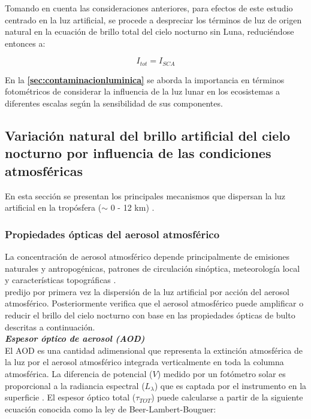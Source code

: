 Tomando en cuenta las consideraciones anteriores, para efectos de este estudio centrado en la luz artificial, se procede a despreciar los términos de luz de origen natural en la ecuación de brillo total del cielo nocturno sin Luna, reduciéndose entonces a:

\begin{equation}
I_{tot} = I_{SCA}
\end{equation}

En la \textbf{\autoref{sec:contaminacionluminica}} se aborda la importancia en términos fotométricos de considerar la influencia de la luz lunar en los ecosistemas a diferentes escalas según la sensibilidad de sus componentes.\\

\subsection{Variación natural del brillo artificial del cielo nocturno por influencia de las condiciones atmosféricas}

En esta sección se presentan los principales mecanismos que dispersan la luz artificial en la tropósfera ($\sim$ 0 - 12 km) \citep{Lohmann2016}.

\subsubsection{Propiedades ópticas del aerosol atmosférico}

La concentración de aerosol atmosférico depende principalmente de emisiones naturales y antropogénicas, patrones de circulación sinóptica, meteorología local y características topográficas \citep{Carabali2017}.\\

\cite{Garstang1991} predijo por primera vez la dispersión de la luz artificial por acción del aerosol atmosférico. Posteriormente \cite{Kocifaj2007} verifica que el aerosol atmosférico puede amplificar o reducir el brillo del cielo nocturno con base en las propiedades ópticas de bulto descritas a continuación.\\

\textit{\textbf{Espesor óptico de aerosol (AOD)}}\\

El AOD es una cantidad adimensional que representa la extinción atmosférica de la luz por el aerosol atmosférico integrada verticalmente en toda la columna atmosférica. La diferencia de potencial ($V$) medido por un fotómetro solar es proporcional a la radiancia espectral ($L_{\lambda}$) que es captada por el instrumento en la superficie \citep{Holben1998}. El espesor óptico total ($\tau_{TOT}$) puede calcularse a partir de la siguiente ecuación conocida como la ley de Beer-Lambert-Bouguer:

